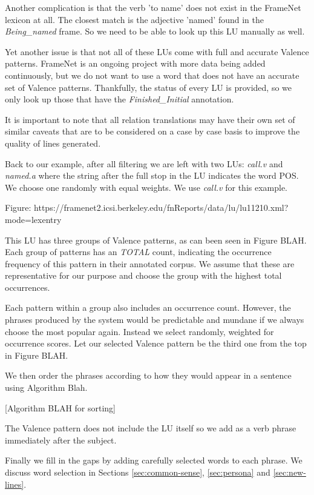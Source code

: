 Another complication is that the verb 'to name' does not exist in the FrameNet lexicon at all. The closest match is the adjective 'named' found in the \textit{Being\_named} frame. So we need to be able to look up this LU manually as well.

Yet another issue is that not all of these LUs come with full and accurate Valence patterns. FrameNet is an ongoing project with more data being added continuously, but we do not want to use a word that does not have an accurate set of Valence patterns. Thankfully, the status of every LU is provided, so we only look up those that have the \textit{Finished\_Initial} annotation.

It is important to note that all relation translations may have their own set of similar caveats that are to be considered on a case by case basis to improve the quality of lines generated.

Back to our example, after all filtering we are left with two LUs: \textit{call.v} and \textit{named.a} where the string after the full stop in the LU indicates the word POS. We choose one randomly with equal weights. We use \textit{call.v} for this example.

Figure: https://framenet2.icsi.berkeley.edu/fnReports/data/lu/lu11210.xml?mode=lexentry

This LU has three groups of Valence patterns, as can been seen in Figure BLAH. Each group of patterns has an \textit{TOTAL} count, indicating the occurrence frequency of this pattern in their annotated corpus. We assume that these are representative for our purpose and choose the group with the highest total occurrences.

Each pattern within a group also includes an occurrence count. However, the phrases produced by the system would be predictable and mundane if we always choose the most popular again. Instead we select randomly, weighted for occurrence scores. Let our selected Valence pattern be the third one from the top in Figure BLAH.

We then order the phrases according to how they would appear in a sentence using Algorithm Blah.

[Algorithm BLAH for sorting]

The Valence pattern does not include the LU itself so we add as a verb phrase immediately after the subject.

Finally we fill in the gaps by adding carefully selected words to each phrase. We discuss word selection in Sections \ref{sec:common-sense}, \ref{sec:persona} and \ref{sec:new-lines}.


